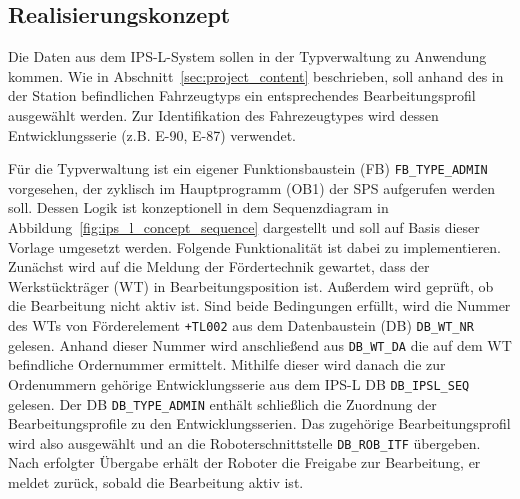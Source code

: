 \subsection{Realisierungskonzept}
\label{subsec:ips_l_concept}

Die Daten aus dem IPS-L-System sollen in der Typverwaltung zu Anwendung kommen. Wie in Abschnitt~\ref{sec:project_content} beschrieben, soll anhand des in der Station befindlichen Fahrzeugtyps ein entsprechendes Bearbeitungsprofil ausgewählt werden. Zur Identifikation des Fahrezeugtypes wird dessen Entwicklungsserie (z.B. E-90, E-87) verwendet.


Für die Typverwaltung ist ein eigener Funktionsbaustein (FB) \texttt{FB\_TYPE\_ADMIN} vorgesehen, der zyklisch im Hauptprogramm (OB1) der SPS aufgerufen werden soll. Dessen Logik ist konzeptionell in dem Sequenzdiagram in Abbildung~\ref{fig:ips_l_concept_sequence} dargestellt und soll auf Basis dieser Vorlage umgesetzt werden. Folgende Funktionalität ist dabei zu implementieren. 
Zunächst wird auf die Meldung der Fördertechnik gewartet, dass der Werkstückträger (WT) in Bearbeitungsposition ist. Außerdem wird geprüft, ob die Bearbeitung nicht aktiv ist. Sind beide Bedingungen erfüllt, wird die Nummer des WTs von Förderelement \texttt{+TL002} aus dem Datenbaustein (DB) \texttt{DB\_WT\_NR} gelesen. Anhand dieser Nummer wird anschließend aus \texttt{DB\_WT\_DA} die auf dem WT befindliche Ordernummer ermittelt. Mithilfe dieser wird danach die zur Ordenummern gehörige Entwicklungsserie aus dem IPS-L DB \texttt{DB\_IPSL\_SEQ} gelesen. Der DB \texttt{DB\_TYPE\_ADMIN} enthält schließlich die Zuordnung der Bearbeitungsprofile zu den Entwicklungsserien. Das zugehörige Bearbeitungsprofil wird also ausgewählt und an die Roboterschnittstelle \texttt{DB\_ROB\_ITF} übergeben. Nach erfolgter Übergabe erhält der Roboter die Freigabe zur Bearbeitung, er meldet zurück, sobald die Bearbeitung aktiv ist. 




